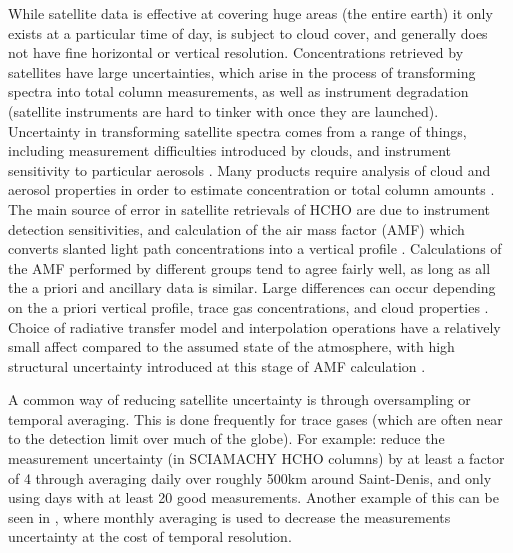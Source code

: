       While satellite data is effective at covering huge areas (the entire earth) it only exists at a particular time of day, is subject to cloud cover, and generally does not have fine horizontal or vertical resolution.
      Concentrations retrieved by satellites have large uncertainties, which arise in the process of transforming spectra into total column measurements, as well as instrument degradation (satellite instruments are hard to tinker with once they are launched).
      Uncertainty in transforming satellite spectra comes from a range of things, including measurement difficulties introduced by clouds, and instrument sensitivity to particular aerosols \parencite{Millet2006}.
      Many products require analysis of cloud and aerosol properties in order to estimate concentration or total column amounts \parencite{Palmer2001,Palmer2003, Marais2012, Vasilkov2017}.
      The main source of error in satellite retrievals of HCHO are due to instrument detection sensitivities, and calculation of the air mass factor (AMF) which converts slanted light path concentrations into a vertical profile \parencite{Millet2006}.
      Calculations of the AMF performed by different groups tend to agree fairly well, as long as all the a priori and ancillary data is similar.
      Large differences can occur depending on the a priori vertical profile, trace gas concentrations, and cloud properties \parencite{Lorente2017}.
      Choice of radiative transfer model and interpolation operations have a relatively small affect compared to the assumed state of the atmosphere, with high structural uncertainty introduced at this stage of AMF calculation \parencite{Lorente2017}.
      
      
      A common way of reducing satellite uncertainty is through oversampling or temporal averaging.
      This is done frequently for trace gases (which are often near to the detection limit over much of the globe).
      For example: \textcite{Vigouroux2009} reduce the measurement uncertainty (in SCIAMACHY HCHO columns) by at least a factor of 4 through averaging daily over roughly 500km around Saint-Denis, and only using days with at least 20 good measurements.
      Another example of this can be seen in \textcite{Dufour2009}, where monthly averaging is used to decrease the measurements uncertainty at the cost of temporal resolution.
      
